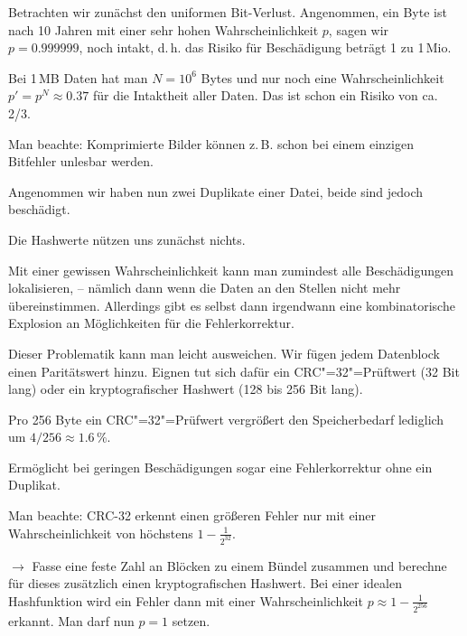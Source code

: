 \documentclass[9pt]{beamer}
\begin{document}
\begin{frame}
Betrachten wir zunächst den uniformen Bit-Verlust. Angenommen, ein Byte
ist nach 10 Jahren mit einer sehr hohen Wahrscheinlichkeit $p$, sagen
wir $p=0.999999$, noch intakt, d.\,h. das Risiko für Beschädigung beträgt
1 zu 1\,Mio.\pause

\vspace{1em}
Bei 1\,MB Daten hat man $N=10^6$ Bytes und nur noch eine
Wahrscheinlichkeit $p' = p^N \approx 0.37$ für die Intaktheit aller Daten.
Das ist schon ein Risiko von ca. 2/3.\pause

\vspace{1em}
Man beachte: Komprimierte Bilder können z.\,B. schon bei einem einzigen
Bitfehler unlesbar werden.
\end{frame}

\begin{frame}
Angenommen wir haben nun zwei Duplikate einer Datei,
beide sind jedoch beschädigt.\pause

\vspace{1em}
Die Hashwerte nützen uns zunächst nichts.\pause

\vspace{1em}
Mit einer gewissen Wahrscheinlichkeit kann man zumindest alle
Beschädigungen lokalisieren, -- nämlich dann wenn die Daten an den
Stellen nicht mehr übereinstimmen. Allerdings gibt es selbst dann
irgendwann eine kombinatorische Explosion an Möglichkeiten für
die Fehlerkorrektur.
\end{frame}

\begin{frame}
Dieser Problematik kann man leicht ausweichen. Wir fügen jedem
Datenblock einen Paritätswert hinzu. Eignen tut sich dafür ein
CRC"=32"=Prüftwert (32 Bit lang) oder ein kryptografischer
Hashwert (128 bis 256 Bit lang).\pause

\vspace{1em}
Pro 256 Byte ein CRC"=32"=Prüfwert vergrößert den Speicherbedarf
lediglich um $4/256 \approx 1.6\,\%$.\pause

\vspace{1em}
Ermöglicht bei geringen Beschädigungen sogar eine
Fehlerkorrektur ohne ein Duplikat.
\end{frame}

\begin{frame}
Man beachte: CRC-32 erkennt einen größeren Fehler nur mit einer
Wahrscheinlichkeit von höchstens $1-\tfrac{1}{2^{32}}$.\pause

\vspace{1em}
$\rightarrow$ Fasse eine feste Zahl an Blöcken zu einem Bündel
zusammen und berechne für dieses zusätzlich einen kryptografischen
Hashwert. Bei einer idealen Hashfunktion wird ein Fehler dann mit einer
Wahrscheinlichkeit $p\approx 1-\tfrac{1}{2^{256}}$ erkannt. Man darf
nun $p=1$ setzen.
\end{frame}
\end{document}
